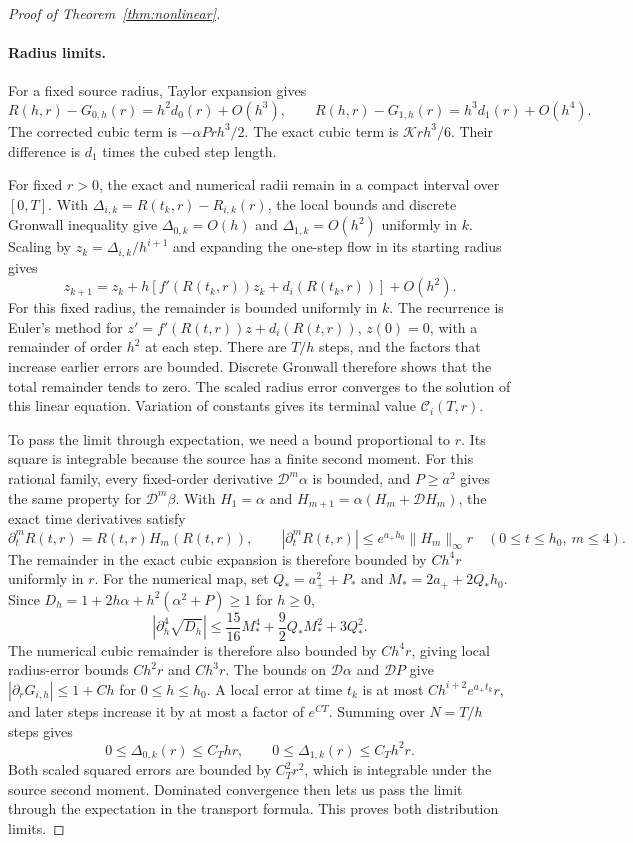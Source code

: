 \begin{proof}[Proof of Theorem~\ref{thm:nonlinear}]
\paragraph{Radius limits.}
For a fixed source radius, Taylor expansion gives
\[
 R(h,r)-G_{0,h}(r)=h^2d_0(r)+O(h^3),\qquad
 R(h,r)-G_{1,h}(r)=h^3d_1(r)+O(h^4).
\]
The corrected cubic term is $-\alpha P rh^3/2$. The exact cubic term is $\mathcal K rh^3/6$. Their difference is $d_1$ times the cubed step length.

For fixed $r>0$, the exact and numerical radii remain in a compact interval over $[0,T]$. With $\Delta_{i,k}=R(t_k,r)-R_{i,k}(r)$, the local bounds and discrete Gronwall inequality give $\Delta_{0,k}=O(h)$ and $\Delta_{1,k}=O(h^2)$ uniformly in $k$. Scaling by $z_k=\Delta_{i,k}/h^{i+1}$ and expanding the one-step flow in its starting radius gives
\[
 z_{k+1}=z_k+h[f'(R(t_k,r))z_k+d_i(R(t_k,r))]+O(h^2).
\]
For this fixed radius, the remainder is bounded uniformly in $k$. The recurrence is Euler's method for $z'=f'(R(t,r))z+d_i(R(t,r))$, $z(0)=0$, with a remainder of order $h^2$ at each step. There are $T/h$ steps, and the factors that increase earlier errors are bounded. Discrete Gronwall therefore shows that the total remainder tends to zero. The scaled radius error converges to the solution of this linear equation. Variation of constants gives its terminal value $\mathcal C_i(T,r)$.

To pass the limit through expectation, we need a bound proportional to $r$. Its square is integrable because the source has a finite second moment. For this rational family, every fixed-order derivative $\mathcal D^m\alpha$ is bounded, and $P\ge a^2$ gives the same property for $\mathcal D^m\beta$. With $H_1=\alpha$ and $H_{m+1}=\alpha(H_m+\mathcal D H_m)$, the exact time derivatives satisfy
\[
 \partial_t^mR(t,r)=R(t,r)H_m(R(t,r)),\qquad
 |\partial_t^mR(t,r)|\le e^{a_+h_0}\|H_m\|_\infty r
 \quad(0\le t\le h_0,\ m\le4).
\]
The remainder in the exact cubic expansion is therefore bounded by $Ch^4r$ uniformly in $r$. For the numerical map, set $Q_* = a_+^2+P_*$ and $M_*=2a_++2Q_*h_0$. Since $D_h=1+2h\alpha+h^2(\alpha^2+P)\ge1$ for $h\ge0$,
\[
 \left|\partial_h^4\sqrt{D_h}\right|
 \le \frac{15}{16}M_*^4+\frac92Q_*M_*^2+3Q_*^2.
\]
The numerical cubic remainder is therefore also bounded by $Ch^4r$, giving local radius-error bounds $Ch^2r$ and $Ch^3r$. The bounds on $\mathcal D\alpha$ and $\mathcal DP$ give $|\partial_rG_{i,h}|\le1+Ch$ for $0\le h\le h_0$. A local error at time $t_k$ is at most $Ch^{i+2}e^{a_+t_k}r$, and later steps increase it by at most a factor of $e^{CT}$. Summing over $N=T/h$ steps gives
\begin{equation}
 0\le\Delta_{0,k}(r)\le C_Thr,\qquad
 0\le\Delta_{1,k}(r)\le C_Th^2r.
 \label{eq:nonlinear-dominating-bounds}
\end{equation}
Both scaled squared errors are bounded by $C_T^2r^2$, which is integrable under the source second moment. Dominated convergence then lets us pass the limit through the expectation in the transport formula. This proves both distribution limits.


\end{proof}
